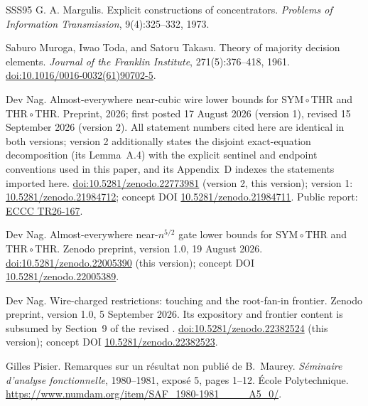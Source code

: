 \documentclass[11pt,letterpaper]{article}
\theoremstyle{definition}
\theoremstyle{remark}
\begin{document}
\begin{thebibliography}{SSS95}
G. A. Margulis.
\newblock Explicit constructions of concentrators.
\newblock \emph{Problems of Information Transmission}, 9(4):325--332, 1973.

Saburo Muroga, Iwao Toda, and Satoru Takasu.
\newblock Theory of majority decision elements.
\newblock \emph{Journal of the Franklin Institute}, 271(5):376--418, 1961.
\newblock \href{https://doi.org/10.1016/0016-0032(61)90702-5}{doi:10.1016/0016-0032(61)90702-5}.

Dev Nag.
\newblock Almost-everywhere near-cubic wire lower bounds for
$\mathrm{SYM}\circ\mathrm{THR}$ and $\mathrm{THR}\circ\mathrm{THR}$.
\newblock Preprint, 2026; first posted 17 August 2026 (version 1),
revised 15 September 2026 (version 2). All statement numbers cited
here are identical in both versions; version 2 additionally states
the disjoint exact-equation decomposition (its Lemma~A.4) with the
explicit sentinel and endpoint conventions used in this paper, and
its Appendix~D indexes the statements imported here.
\newblock \href{https://doi.org/10.5281/zenodo.22773981}{doi:10.5281/zenodo.22773981}
(version 2, this version); version 1:
\href{https://doi.org/10.5281/zenodo.21984712}{10.5281/zenodo.21984712};
concept DOI
\href{https://doi.org/10.5281/zenodo.21984711}{10.5281/zenodo.21984711}.
Public report: \href{https://eccc.weizmann.ac.il/report/2026/167/}{ECCC TR26-167}.

Dev Nag.
\newblock Almost-everywhere near-$n^{5/2}$ gate lower bounds for
$\mathrm{SYM}\circ\mathrm{THR}$ and $\mathrm{THR}\circ\mathrm{THR}$.
\newblock Zenodo preprint, version 1.0, 19 August 2026.
\newblock \href{https://doi.org/10.5281/zenodo.22005390}{doi:10.5281/zenodo.22005390}
(this version); concept DOI
\href{https://doi.org/10.5281/zenodo.22005389}{10.5281/zenodo.22005389}.

Dev Nag.
\newblock Wire-charged restrictions: touching and the root-fan-in frontier.
\newblock Zenodo preprint, version 1.0, 5 September 2026. Its
expository and frontier content is subsumed by Section~9 of the
revised \cite{NagCubic}.
\newblock \href{https://doi.org/10.5281/zenodo.22382524}{doi:10.5281/zenodo.22382524}
(this version); concept DOI
\href{https://doi.org/10.5281/zenodo.22382523}{10.5281/zenodo.22382523}.

Gilles Pisier.
\newblock Remarques sur un r\'esultat non publi\'e de B.~Maurey.
\newblock \emph{S\'eminaire d'analyse fonctionnelle}, 1980--1981,
  expos\'e 5, pages 1--12. \'Ecole Polytechnique.
\newblock \url{https://www.numdam.org/item/SAF_1980-1981____A5_0/}.


\end{thebibliography}
\end{document}
